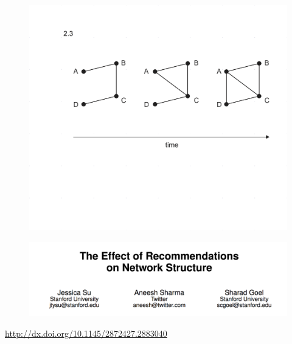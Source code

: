 \documentclass[aspectratio=169]{beamer}
\begin{document}
\begin{frame}

\begin{figure}
\centering
\includegraphics[width=\textwidth]{figures/2_3}
\end{figure}


\end{frame}
\begin{frame}

\begin{figure}
\centering
\includegraphics[width = \textwidth]{figures/su_effect_2016_title}
\end{figure}

\vfill

\url{http://dx.doi.org/10.1145/2872427.2883040}

\end{frame}
\end{document}
